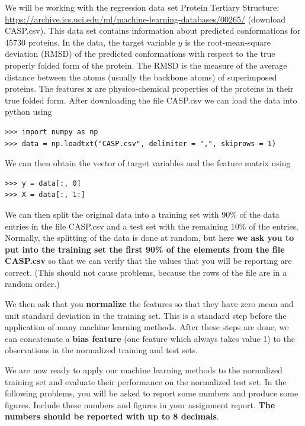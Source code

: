 \documentclass[submit]{harvardml}
\begin{document}
We will be working with the regression data set Protein
Tertiary Structure:
\url{https://archive.ics.uci.edu/ml/machine-learning-databases/00265/}
(download CASP.csv). This data set contains information about predicted 
conformations for 45730
proteins. In the data, the target variable $y$ is the root-mean-square
deviation (RMSD) of the predicted conformations with respect to the true properly
folded form of the protein. The RMSD is the measure of the average distance
between the atoms (usually the backbone atoms) of superimposed proteins.
The features $\mathbf{x}$ are
physico-chemical properties of the proteins in their true folded form. After
downloading the file CASP.csv we can load the data into python using
\begin{verbatim}
>>> import numpy as np
>>> data = np.loadtxt("CASP.csv", delimiter = ",", skiprows = 1)
\end{verbatim}
We can then obtain the vector of target variables and the feature matrix using
\begin{verbatim}
>>> y = data[:, 0]
>>> X = data[:, 1:]
\end{verbatim}
We can then split the original data into a training set with 90\% of the data
entries in the file CASP.csv and a test set with the remaining 10\% of the
entries. Normally, the splitting of the data is done at random, but here {\bf we ask
you to put into the training set the first 90\% of the elements from the
file CASP.csv} so that we can verify that the values that you will be reporting are correct.
(This should not cause problems, because the rows of the file are in a random order.)

We then ask that you \textbf{normalize} the features so that they have
zero mean and unit standard deviation in the training set. This is a
standard step before the application of many machine learning
methods. After these steps are done, we can concatenate a \textbf{bias
  feature} (one feature which always takes value 1) to the
observations in the normalized training and test sets.


We are now ready to apply our machine learning methods to the normalized training set and
evaluate their performance on the normalized test set.
In the following problems, you will be asked to report some numbers and produce
some figures. Include these numbers and figures in your assignment report.
{\bf The numbers should be reported with up to 8 decimals}.
\vspace{0.2cm}
\end{document}
